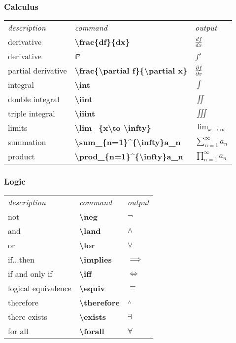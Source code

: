 \documentclass{article}
\begin{document}
\subsubsection{Calculus}

\begin{table}[H]
 \begin{tabular}{lll}
  \textit{description} &\textit{command} &\textit{output}\\
  derivative &\textbf{\textbackslash frac\{df\}\{dx\}} &$\frac{df}{dx}$\\
  derivative &\textbf{f'} &$f'$\\
  partial derivative &\textbf{\textbackslash frac\{\textbackslash partial f\}\{\textbackslash partial x\}} &$\frac{\partial f}{\partial x}$\\
  integral &\textbf{\textbackslash int} &$\int$\\
  double integral &\textbf{\textbackslash iint} &$\iint$\\
  triple integral &\textbf{\textbackslash iiint} &$\iiint$\\
  limits &\textbf{\textbackslash lim\_\{x\textbackslash to \textbackslash infty\}} &$\displaystyle \lim_{x\to \infty}$\\
  summation &\textbf{\textbackslash sum\_\{n=1\}\textasciicircum\{\textbackslash infty\}a\_n} &$\displaystyle \sum_{n=1}^{\infty}a_n$\\
  product &\textbf{\textbackslash prod\_\{n=1\}\textasciicircum\{\textbackslash infty\}a\_n} &$\displaystyle \prod_{n=1}^{\infty}a_n$\\
 \end{tabular}
\end{table}

\subsubsection{Logic}

\begin{table}[H]
 \begin{tabular}{lll}
  \textit{description} &\textit{command} &\textit{output}\\
  not &\textbf{\textbackslash neg} &$\neg$\\
  and &\textbf{\textbackslash land} &$\land$\\
  or &\textbf{\textbackslash lor} &$\lor$\\
  if...then &\textbf{\textbackslash implies} &$\implies$\\
  if and only if &\textbf{\textbackslash iff} &$\iff$\\
  logical equivalence &\textbf{\textbackslash equiv} &$\equiv$\\
  therefore &\textbf{\textbackslash therefore} &$\therefore$\\
  there exists &\textbf{\textbackslash exists} &$\exists$\\
  for all &\textbf{\textbackslash forall} &$\forall$\\
 \end{tabular}
\end{table}
\end{document}
